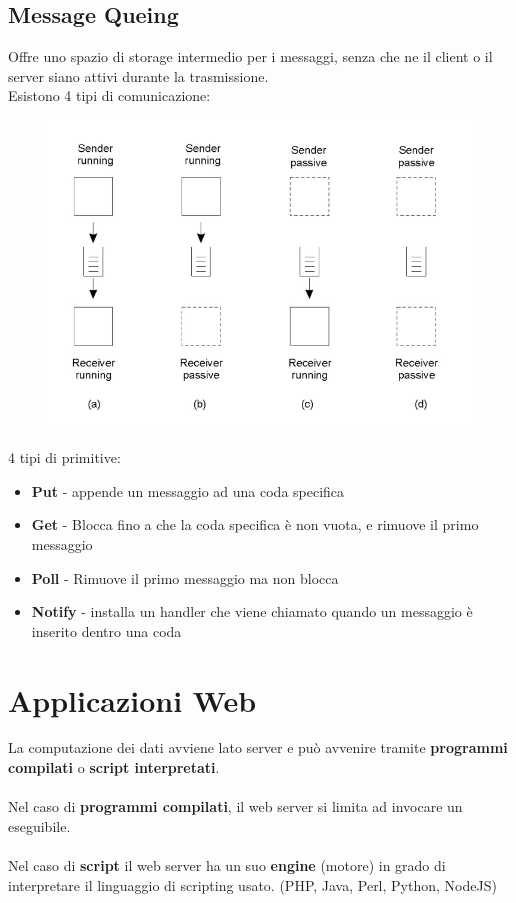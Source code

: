\documentclass[12pt, a4paper]{article}
\begin{document}
    \subsection{Message Queing}
    Offre uno spazio di storage intermedio per i messaggi, senza che ne il client 
    o il server siano attivi durante la trasmissione. \\Esistono 4 tipi di comunicazione:
    \begin{figure}[htbp]
        \centering
        \includegraphics[scale=0.5]{queing.png}
    \end{figure}
    4 tipi di primitive:
    \begin{itemize}
        \item \textbf{Put} - appende un messaggio ad una coda specifica
        \item \textbf{Get} - Blocca fino a che la coda specifica è non vuota, e rimuove il primo messaggio
        \item \textbf{Poll} - Rimuove il primo messaggio ma non blocca 
        \item \textbf{Notify} - installa un handler che viene chiamato quando un messaggio è inserito dentro una coda
    \end{itemize}








    \newpage
    \section{Applicazioni Web}
    La computazione dei dati avviene lato server e può avvenire tramite \textbf{programmi compilati} o
    \textbf{script interpretati}.
    \\\\Nel caso di \textbf{programmi compilati}, il web server si limita ad invocare un eseguibile.
    \\\\Nel caso di \textbf{script} il web server ha un suo \textbf{engine} (motore) in grado di 
    interpretare il linguaggio di scripting usato. (PHP, Java, Perl, Python, NodeJS)
\end{document}
